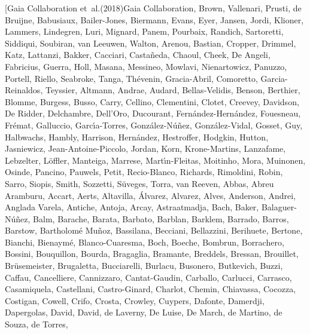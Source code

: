 \documentclass[twocolumn]{aastex631}
\begin{document}
\begin{thebibliography}{}
\bibitem[{{Gaia Collaboration} {et~al.}(2018){Gaia Collaboration}, {Brown},
  {Vallenari}, {Prusti}, {de Bruijne}, {Babusiaux}, {Bailer-Jones}, {Biermann},
  {Evans}, {Eyer}, {Jansen}, {Jordi}, {Klioner}, {Lammers}, {Lindegren},
  {Luri}, {Mignard}, {Panem}, {Pourbaix}, {Randich}, {Sartoretti}, {Siddiqui},
  {Soubiran}, {van Leeuwen}, {Walton}, {Arenou}, {Bastian}, {Cropper},
  {Drimmel}, {Katz}, {Lattanzi}, {Bakker}, {Cacciari}, {Casta{\~n}eda},
  {Chaoul}, {Cheek}, {De Angeli}, {Fabricius}, {Guerra}, {Holl}, {Masana},
  {Messineo}, {Mowlavi}, {Nienartowicz}, {Panuzzo}, {Portell}, {Riello},
  {Seabroke}, {Tanga}, {Th{\'e}venin}, {Gracia-Abril}, {Comoretto},
  {Garcia-Reinaldos}, {Teyssier}, {Altmann}, {Andrae}, {Audard},
  {Bellas-Velidis}, {Benson}, {Berthier}, {Blomme}, {Burgess}, {Busso},
  {Carry}, {Cellino}, {Clementini}, {Clotet}, {Creevey}, {Davidson}, {De
  Ridder}, {Delchambre}, {Dell'Oro}, {Ducourant},
  {Fern{\'a}ndez-Hern{\'a}ndez}, {Fouesneau}, {Fr{\'e}mat}, {Galluccio},
  {Garc{\'\i}a-Torres}, {Gonz{\'a}lez-N{\'u}{\~n}ez}, {Gonz{\'a}lez-Vidal},
  {Gosset}, {Guy}, {Halbwachs}, {Hambly}, {Harrison}, {Hern{\'a}ndez},
  {Hestroffer}, {Hodgkin}, {Hutton}, {Jasniewicz}, {Jean-Antoine-Piccolo},
  {Jordan}, {Korn}, {Krone-Martins}, {Lanzafame}, {Lebzelter}, {L{\"o}ffler},
  {Manteiga}, {Marrese}, {Mart{\'\i}n-Fleitas}, {Moitinho}, {Mora}, {Muinonen},
  {Osinde}, {Pancino}, {Pauwels}, {Petit}, {Recio-Blanco}, {Richards},
  {Rimoldini}, {Robin}, {Sarro}, {Siopis}, {Smith}, {Sozzetti}, {S{\"u}veges},
  {Torra}, {van Reeven}, {Abbas}, {Abreu Aramburu}, {Accart}, {Aerts},
  {Altavilla}, {{\'A}lvarez}, {Alvarez}, {Alves}, {Anderson}, {Andrei},
  {Anglada Varela}, {Antiche}, {Antoja}, {Arcay}, {Astraatmadja}, {Bach},
  {Baker}, {Balaguer-N{\'u}{\~n}ez}, {Balm}, {Barache}, {Barata}, {Barbato},
  {Barblan}, {Barklem}, {Barrado}, {Barros}, {Barstow}, {Bartholom{\'e}
  Mu{\~n}oz}, {Bassilana}, {Becciani}, {Bellazzini}, {Berihuete}, {Bertone},
  {Bianchi}, {Bienaym{\'e}}, {Blanco-Cuaresma}, {Boch}, {Boeche}, {Bombrun},
  {Borrachero}, {Bossini}, {Bouquillon}, {Bourda}, {Bragaglia}, {Bramante},
  {Breddels}, {Bressan}, {Brouillet}, {Br{\"u}semeister}, {Brugaletta},
  {Bucciarelli}, {Burlacu}, {Busonero}, {Butkevich}, {Buzzi}, {Caffau},
  {Cancelliere}, {Cannizzaro}, {Cantat-Gaudin}, {Carballo}, {Carlucci},
  {Carrasco}, {Casamiquela}, {Castellani}, {Castro-Ginard}, {Charlot},
  {Chemin}, {Chiavassa}, {Cocozza}, {Costigan}, {Cowell}, {Crifo}, {Crosta},
  {Crowley}, {Cuypers}, {Dafonte}, {Damerdji}, {Dapergolas}, {David}, {David},
  {de Laverny}, {De Luise}, {De March}, {de Martino}, {de Souza}, {de Torres},
}
\end{thebibliography}
\end{document}
